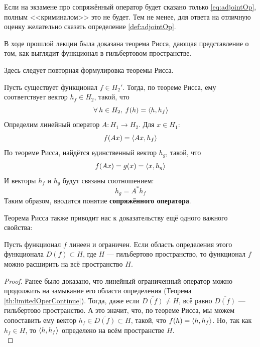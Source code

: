 \documentclass[12pt]{article}
\begin{document}
	{ \color{gray}
		Если на экзамене про сопряжённый оператор будет сказано только \eqref{eq:adjointOp}, полным <<криминалом>> это не будет.
		Тем не менее, для ответа на отличную оценку желательно сказать определение \ref{def:adjointOp}.
	}


	В ходе прошлой лекции была доказана теорема Рисса, дающая представление о том, как выглядит функционал в гильбертовом пространстве.
	
	{\color{gray}
		Здесь следует повторная формулировка теоремы Рисса.
	}
	
	Пусть существует функционал $f \in H_2'$. Тогда, по теореме Рисса, ему соответствует вектор $h_f \in H_2$, такой, что 
	$$\forall h \in H_2, \: f(h) = \scal{h}{h_f}$$
	Определим линейный оператор $A : H_1 \rightarrow H_2$. Для $x \in H_1$: 
	$$f(Ax) = \left\langle Ax, h_f \right\rangle$$
	По теореме Рисса, найдётся единственный вектор $h_g$, такой, что 
	$$f(Ax) = g(x) = \left\langle x, h_g \right\rangle$$
	И векторы $h_f$ и $h_g$ будут связаны соотношением:
	$$h_g = A^{*}h_f$$
	Таким образом, вводится понятие \textbf{сопряжённого оператора}.

	Теорема Рисса также приводит нас к доказательству ещё одного важного свойства:
	\begin{state}
		Пусть функционал $f$ линеен и ограничен. Если область определения этого функционала $D(f) \subset H$, 
		где $H$ --- гильбертово пространство, то функционал $f$ можно расширить на всё пространство $H$.
	\end{state}
	\begin{proof}
		Ранее было доказано, что линейный ограниченный оператор можно продолжить на замыкание его области определения 
		(Теорема \ref{th:limitedOperContinue}). Тогда, даже если $\overline{D(f)} \neq H$, всё равно $\overline{D(f)}$ --- гильбертово 
		пространство.
		А это значит, что, по теореме Рисса, мы можем сопоставить ему вектор $h_f \in \overline{D(f)} \subset H$, такой, что 
		$f(h) = \left\langle h, h_f \right\rangle$. Но, так как $h_f \in H$, то $\left\langle h, h_f \right\rangle$ определено на всём пространстве $H$. \\
	\end{proof}
	
\end{document}
